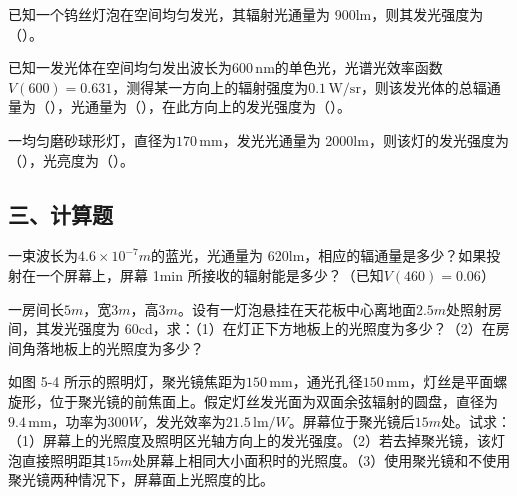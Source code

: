 \documentclass[standard, analysis, notocnum]{ExBook}
\newcommand{\answerarea}[1][8cm]{%
  \par\vspace{2mm}%
  \noindent{\color{themeColor!35}\rule{\linewidth}{0.4pt}}\par
  \noindent\begin{minipage}[t][#1][t]{\linewidth}\vspace{0pt}\end{minipage}\par
  \noindent{\color{themeColor!35}\rule{\linewidth}{0.4pt}}\par
}
\begin{document}
\begin{qitems}
\begin{bbox}
\qitem 已知一个钨丝灯泡在空间均匀发光，其辐射光通量为 900lm，则其发光强度为（\hspace{1.6em}）。
\answerarea[3.5cm]
\end{bbox}
\begin{bbox}
\qitem 已知一发光体在空间均匀发出波长为$600\,\mathrm{nm}$的单色光，光谱光效率函数$V(600)=0.631$，测得某一方向上的辐射强度为$0.1\,\mathrm{W/sr}$，则该发光体的总辐通量为（\hspace{1.6em}），光通量为（\hspace{1.6em}），在此方向上的发光强度为（\hspace{1.6em}）。
\answerarea[3.5cm]
\end{bbox}
\begin{bbox}
\qitem 一均匀磨砂球形灯，直径为$170\,\mathrm{mm}$，发光光通量为 2000lm，则该灯的发光强度为（\hspace{1.6em}），光亮度为（\hspace{1.6em}）。
\answerarea[3.5cm]
\end{bbox}
\end{qitems}

\subsection{三、计算题}
\begin{qitems}[startnum=1]
\qitem 一束波长为$4.6\times 10^{-7}m$的蓝光，光通量为 620lm，相应的辐通量是多少？如果投射在一个屏幕上，屏幕 1min 所接收的辐射能是多少？（已知$V(460)=0.06$）
\label{q:95:start}
\answerarea[8cm]
\label{q:95:end}
\end{qitems}

\begin{qitems}[startnum=2]
\qitem 一房间长$5m$，宽$3m$，高$3m$。设有一灯泡悬挂在天花板中心离地面$2.5m$处照射房间，其发光强度为 60cd，求：（1）在灯正下方地板上的光照度为多少？（2）在房间角落地板上的光照度为多少？
\label{q:96:start}
\answerarea[8cm]
\label{q:96:end}
\end{qitems}

\begin{qitems}[startnum=3]
\qitem 如图 5-4 所示的照明灯，聚光镜焦距为$150\,\mathrm{mm}$，通光孔径$150\,\mathrm{mm}$，灯丝是平面螺旋形，位于聚光镜的前焦面上。假定灯丝发光面为双面余弦辐射的圆盘，直径为$9.4\,\mathrm{mm}$，功率为$300W$，发光效率为$21.5\,\mathrm{lm}/W$。屏幕位于聚光镜后$15m$处。试求：（1）屏幕上的光照度及照明区光轴方向上的发光强度。（2）若去掉聚光镜，该灯泡直接照明距其$15m$处屏幕上相同大小面积时的光照度。（3）使用聚光镜和不使用聚光镜两种情况下，屏幕面上光照度的比。
\label{q:97:start}
\answerarea[8cm]
\label{q:97:end}
\end{qitems}
\end{document}
